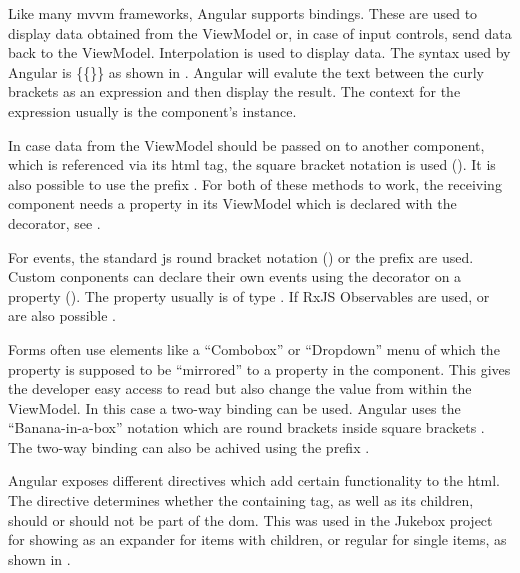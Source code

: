 
Like many \gls{mvvm} frameworks, Angular supports bindings. These are used to display data obtained from the ViewModel or, in case of input controls, send data back to the ViewModel. Interpolation is used to display data. The syntax used by Angular is \{\{\}\} as shown in . Angular will evalute the text between the curly brackets as an expression and then display the result. The context for the expression usually is the component's instance.

In case data from the ViewModel should be passed on to another component, which is referenced via its \gls{html} tag, the square bracket notation is used (). It is also possible to use the  prefix \zB {}. For both of these methods to work, the receiving component needs a property in its ViewModel which is declared with the  decorator, see .

For events, the standard \gls{js} round bracket notation () or the  prefix \zB {} are used. Custom conponents can declare their own events using the  decorator on a property (). The property usually is of type . If RxJS Observables are used,  or  are also possible \cite{rxjs}.

Forms often use elements like a \enquote{Combobox} or \enquote{Dropdown} menu of which the  property is supposed to be \enquote{mirrored} to a property in the component. This gives the developer easy access to read but also change the value from within the ViewModel. In this case a two-way binding can be used. Angular uses the \enquote{Banana-in-a-box} notation which are round brackets inside square brackets \zB {}. The two-way binding can also be achived using the  prefix \zB {}.


Angular exposes different directives which add certain functionality to the \gls{html}. The  directive determines whether the containing tag, as well as its children, should or should not be part of the \gls{dom}. This was used in the Jukebox project for showing  as an expander for items with children, or regular for single items, as shown in .

